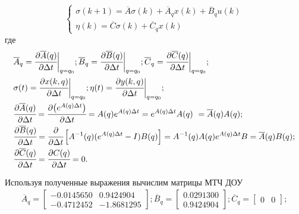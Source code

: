 \begin{equation}\label{eq_mts_d}
	\begin{cases}
		\sigma(k+1) = \overline{A} \sigma(k) + \overline{A}_{q} x(k) + \overline{B}_{q} u(k)\\
		\eta (k) = \overline{C} \sigma (k) + \overline{C}_{q} x(k)
	\end{cases}
\end{equation}
где 
\begin{align*}
	&\overline{A}_{q} = \cfrac{\partial{\overline{A}(q)}}{\partial{\Delta t}} \bigg|_{q=q_0};
	\overline{B}_{q} = \cfrac{\partial{\overline{B}(q)}}{\partial{\Delta t}} \bigg|_{q=q_0};
	\overline{C}_{q} = \cfrac{\partial{\overline{C}(q)}}{\partial{\Delta t}} \bigg|_{q=q_0};\\
	&\sigma(t) = \cfrac{\partial{x(k,q)}}{\partial{\Delta t}} \bigg|_{q=q_0};
	\eta(t) = \cfrac{\partial{y(k,q)}}{\partial{\Delta t}} \bigg|_{q=q_0};\\
	&\cfrac{\partial{\overline{A}(q)}}{\partial{\Delta t}} = 
	\cfrac{\partial{\left(e^{A(q) \Delta t}\right)}}{\partial{\Delta t}} =
	A(q) e^{A(q) \Delta t} =  e^{A(q) \Delta t} A(q)\ = \overline{A}(q) A(q);\\
	&\cfrac{\partial{\overline{B}(q)}}{\partial{\Delta t}} = 
	\cfrac{\partial{}}{\partial{\Delta t}} \left[A^{-1}(q)(e^{A(q) \Delta t} - I)B(q)\right] = 
	A^{-1}(q) A(q) e^{A(q) \Delta t} B = \overline{A}(q) B(q);\\
	&\cfrac{\partial{\overline{C}(q)}}{\partial{\Delta t}} = 
	\cfrac{\partial{C(q)}}{\partial{\Delta t}} = 0.
\end{align*}

Используя полученные выражения вычислим матрицы МТЧ ДОУ
\begin{align*}
	\overline{A}_q =
	\begin{bmatrix}
		- 0.0145650 &   0.9424904\\  
		- 0.4712452 & - 1.8681295  
	\end{bmatrix};
	\overline{B}_q =
	\begin{bmatrix}
		0.0291300\\
		0.9424904  
	\end{bmatrix};
	\overline{C}_q =
	\begin{bmatrix}
		0  &  0 
	\end{bmatrix};
\end{align*}

